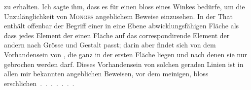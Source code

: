 %
zu erhalten. Ich sagte ihm, dass es für einen  bloss eines Winkes bedürfe, um die Unzulänglichkeit von \textsc{Monges} angeblichem Beweise einzusehen. In der That enthält offenbar der Begriff einer in eine Ebene abwicklungsfähigen Fläche  als dass jedes Element der einen Fläche auf das correspondirende Element der andern nach Grösse und Gestalt passt; darin aber findet sich  von dem Vorhandensein von , die ganz in der ersten Fläche liegen und nach denen sie nur gebrochen werden darf. Dieses Vorhandensein von solchen geraden Linien ist in allen mir bekannten angeblichen Beweisen, vor dem meinigen, bloss \mbox{erschlichen . . . . . . .}

